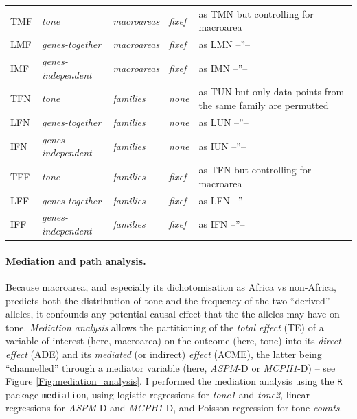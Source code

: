 \documentclass[twoside,onecolumn]{article}
\begin{document}
\begin{table}[h]
\begin{tabularx}{\textwidth}{|l|l|l|l|X|}
    \midrule
    TMF & \textit{tone} & \textit{macroareas} & \textit{fixef} & as TMN but controlling for macroarea \\
    LMF & \textit{genes-together} & \textit{macroareas} & \textit{fixef} & as LMN --''-- \\
    IMF & \textit{genes-independent} & \textit{macroareas} & \textit{fixef} & as IMN --''-- \\
    \midrule
    TFN & \textit{tone} & \textit{families} & \textit{none} & as TUN but only data points from the same family are permutted \\
    LFN & \textit{genes-together} & \textit{families} & \textit{none} & as LUN --''-- \\
    IFN & \textit{genes-independent} & \textit{families} & \textit{none} & as IUN --''-- \\
    \midrule
    TFF & \textit{tone} & \textit{families} & \textit{fixef} & as TFN but controlling for macroarea \\
    LFF & \textit{genes-together} & \textit{families} & \textit{fixef} & as LFN --''-- \\
    IFF & \textit{genes-independent} & \textit{families} & \textit{fixef} & as IFN --''-- \\
    \bottomrule
  \end{tabularx}
\end{table}

\paragraph{Mediation and path analysis.}

Because macroarea, and especially its dichotomisation as Africa vs non-Africa, predicts both the distribution of tone and the frequency of the two ``derived'' alleles, it confounds any potential causal effect that the the alleles may have on tone.
\emph{Mediation analysis} \citep{mackinnon_mediation_2007} allows the partitioning of the \emph{total effect} (TE) of a variable of interest (here, macroarea) on the outcome (here, tone) into its \emph{direct effect} (ADE) and its \emph{mediated} (or indirect) \emph{effect} (ACME), the latter being ``channelled'' through a mediator variable (here, \textit{ASPM}-D or \textit{MCPH1}-D) -- see Figure \ref{Fig:mediation_analysis}.
I performed the mediation analysis using the \texttt{R} package \texttt{mediation}, using logistic regressions for \textit{tone1} and \textit{tone2}, linear regressions for \textit{ASPM}-D and \textit{MCPH1}-D, and Poisson regression for tone \textit{counts}.
\end{document}
